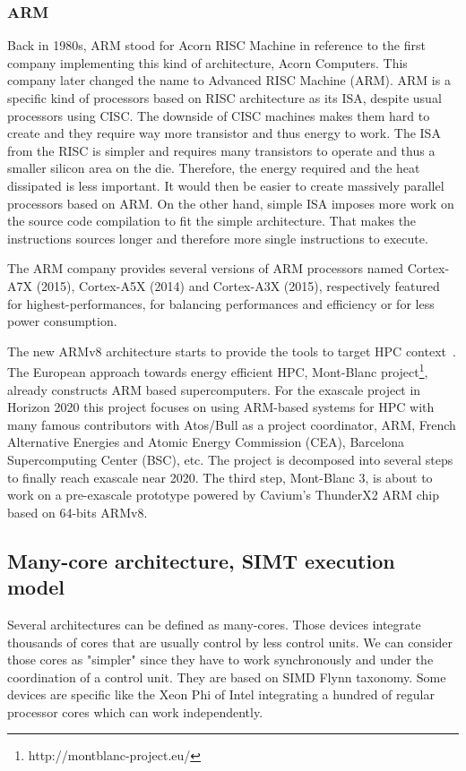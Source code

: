 \subsubsection{ARM}
Back in 1980s, ARM stood for Acorn RISC Machine in reference to the first company implementing this kind of architecture, Acorn Computers. 
This company later changed the name to Advanced RISC Machine (ARM). 
ARM is a specific kind of processors based on RISC architecture as its ISA, despite usual processors using CISC.
The downside of CISC machines makes them hard to create and they require way more transistor and thus energy to work. 
The ISA from the RISC is simpler and requires many transistors to operate and thus a smaller silicon area on the die.
Therefore, the energy required and the heat dissipated is less important. 
It would then be easier to create massively parallel processors based on ARM. 
On the other hand, simple ISA imposes more work on the source code compilation to fit the simple architecture. 
That makes the instructions sources longer and therefore more single instructions to execute. 

The ARM company provides several versions of ARM processors named Cortex-A7X (2015), Cortex-A5X (2014) and Cortex-A3X (2015), respectively featured for highest-performances, for balancing performances and efficiency or for less power consumption. 

The new ARMv8 architecture starts to provide the tools to target HPC context~\cite{rico2017arm}.
The European approach towards energy efficient HPC, Mont-Blanc project\footnote{http://montblanc-project.eu/}, already constructs ARM based supercomputers. 
For the exascale project in Horizon 2020 this project focuses on using ARM-based systems for HPC with many famous contributors with Atos/Bull as a project coordinator, ARM, French Alternative Energies and Atomic Energy Commission (CEA), Barcelona Supercomputing Center (BSC), etc.
The project is decomposed into several steps to finally reach exascale near 2020. 
The third step, Mont-Blanc 3, is about to work on a pre-exascale prototype powered by Cavium’s ThunderX2 ARM chip based on 64-bits ARMv8.

\subsection{Many-core architecture, SIMT execution model}
Several architectures can be defined as many-cores. 
Those devices integrate thousands of cores that are usually control by less control units. 
We can consider those cores as "simpler" since they have to work synchronously and under the coordination of a control unit.
They are based on SIMD Flynn taxonomy. 
Some devices are specific like the Xeon Phi of Intel integrating a hundred of regular processor cores which can work independently. 

